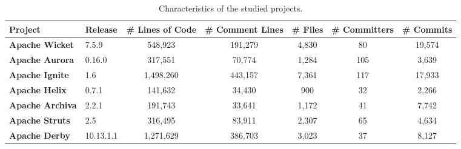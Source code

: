 \begin{landscape}
\begin{table}[htbp]
\begin{adjustbox}{width=1.3\textwidth}
\end{adjustbox}

\end{table}

\end{landscape}



\begin{landscape}

	
	
	\begin{table}[htbp]
		\small
		\centering
		\caption{Characteristics of the studied projects.}
		\begin{adjustbox}{width=1.3\textwidth}
			
			
			\begin{tabular}{l|l|c|c|c|c|c}
				\hline
				\textbf{Project}           & \textbf{Release} & \textbf{\# Lines of Code} & \textbf{\# Comment Lines} & \textbf{\# Files} & \textbf{\# Committers} & \textbf{\# Commits} \\ \hline
				\textbf{Apache Wicket}     & 7.5.9            & 548,923                    &          191,279           &       4,830        &           80           &        19,574        \\ \hline
				\textbf{Apache Aurora}     & 0.16.0           & 317,551                    &           70,774           &       1,284        &          105           &        3,639         \\ \hline
				\textbf{Apache Ignite}     & 1.6              & 1,498,260                   &          443,157           &       7,361        &          117           &        17,933        \\ \hline
				\textbf{Apache Helix}      & 0.7.1            & 141,632                    &           34,430           &        900        &           32           &        2,266         \\ \hline
				\textbf{Apache Archiva}    & 2.2.1            & 191,743                    &           33,641           &       1,172        &           41           &        7,742         \\ \hline
				\textbf{Apache Struts}     & 2.5              & 316,495                    &           83,911           &       2,307        &           65           &        4,634         \\ \hline
				\textbf{Apache Derby}      & 10.13.1.1        & 1,271,629                   &          386,703           &       3,023        &           37           &        8,127         \\ \hline

\end{tabular}
\end{adjustbox}
\end{table}
\end{landscape}
